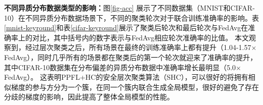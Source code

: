 \textbf{不同异质分布数据类型的影响：}图\ref{fig-acc} 展示了不同数据集（MNIST和CIFAR-10）在不同异质分布数据场景下，不同的聚类轮次对于联合训练准确率的影响。表\ref{mnist-keyround}和表\ref{cifar-keyround}展示了聚类后轮次和最后轮次与FedAvg在准确率上的对比，其中括号内的数字表示与FedAvg相应轮次准确率的比值。
本文观察到，经过层次聚类之后，所有场景在最终的训练准确率上都有提升（1.04-1.57$\times$FedAvg），同时几乎所有的场景都在聚类后的第一个轮次就迎来了准确率的提升，
其中CIFAR-10数据集在分布偏差的异质分布数据中准确率增长最明显（5.0$\times$FedAvg）。
这表明PPFL+HC的安全层次聚类算法（SHC），可以很好的将拥有相似梯度的参与方分为一个簇，在同一个簇内联合生成全局模型，很好的避免了存在分歧的梯度的影响，因此提高了整体全局模型的性能。

{\wuhao
\begin{figure}[htb]
	\centering
	\qquad
	\\
\end{figure}}
